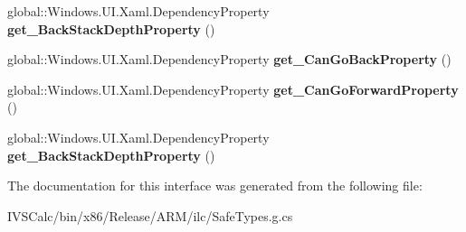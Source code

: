 \begin{DoxyCompactItemize}
global\+::\+Windows.\+U\+I.\+Xaml.\+Dependency\+Property {\bfseries get\+\_\+\+Back\+Stack\+Depth\+Property} ()
\item 
\mbox{\label{interface_windows_1_1_u_i_1_1_xaml_1_1_controls_1_1_i_frame_statics_ab9ef06194fcc3f0ac0fe148b9708b5a2}} 
global\+::\+Windows.\+U\+I.\+Xaml.\+Dependency\+Property {\bfseries get\+\_\+\+Can\+Go\+Back\+Property} ()
\item 
\mbox{\label{interface_windows_1_1_u_i_1_1_xaml_1_1_controls_1_1_i_frame_statics_a702820de0c4191e80538e6ccaa2807a4}} 
global\+::\+Windows.\+U\+I.\+Xaml.\+Dependency\+Property {\bfseries get\+\_\+\+Can\+Go\+Forward\+Property} ()
\item 
\mbox{\label{interface_windows_1_1_u_i_1_1_xaml_1_1_controls_1_1_i_frame_statics_ab70bb623eafe2acb9e5726f24c2a7b97}} 
global\+::\+Windows.\+U\+I.\+Xaml.\+Dependency\+Property {\bfseries get\+\_\+\+Back\+Stack\+Depth\+Property} ()
\end{DoxyCompactItemize}


The documentation for this interface was generated from the following file\+:\begin{DoxyCompactItemize}
\item 
I\+V\+S\+Calc/bin/x86/\+Release/\+A\+R\+M/ilc/Safe\+Types.\+g.\+cs\end{DoxyCompactItemize}
